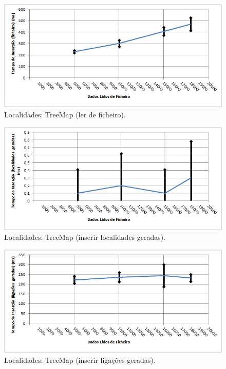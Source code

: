 \documentclass[a5paper,twocolumn, 11pt]{article}
\begin{document}
\begin{figure}[h!b!t!]
    \caption[Localidades: TreeMap (ler de ficheiro)]{Localidades: TreeMap (ler de ficheiro).}
    \label{hashtable}
    \centering
        \includegraphics[width=400pt]{cloc_conf4_o1.png}
\end{figure}
\begin{figure}[h!b!t!]
    \caption[Localidades: TreeMap (inserir localidades geradas)]{Localidades: TreeMap (inserir localidades geradas).}
    \label{hashtable}
    \centering
        \includegraphics[width=400pt]{cloc_conf4_o2.png}
\end{figure}
\begin{figure}[h!b!t!]
    \caption[Localidades: TreeMap (inserir ligações geradas)]{Localidades: TreeMap (inserir ligações geradas).}
    \label{hashtable}
    \centering
        \includegraphics[width=400pt]{cloc_conf4_o3.png}
\end{figure}
\end{document}
